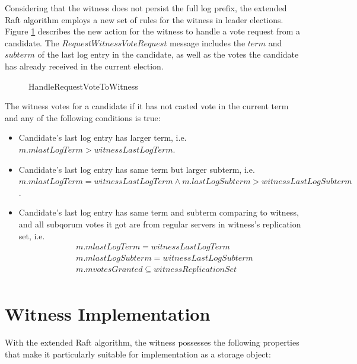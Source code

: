 Considering that the witness does not persist the full log prefix, the extended Raft algorithm employs a new set of rules for the witness in leader elections. Figure \ref{fig:handle-request-witness-vote} describes the new action for the witness to handle a vote request from a candidate. The $RequestWitnessVoteRequest$ message includes the $term$ and $subterm$ of the last log entry in the candidate, as well as the votes the candidate has already received in the current election.
\begin{figure}
    \begin{framed}
        
    \end{framed}
    \caption{HandleRequestVoteToWitness}
    \label{fig:handle-request-witness-vote}
\end{figure}
The witness votes for a candidate if it has not casted vote in the current term and any of the following conditions is true:
\begin{itemize}
    \item Candidate's last log entry has larger term, i.e. $m.mlastLogTerm > witnessLastLogTerm$.
    \item Candidate's last log entry has same term but larger subterm, i.e. $m.mlastLogTerm = witnessLastLogTerm \land m.lastLogSubterm > witnessLastLogSubterm$.
    \item Candidate's last log entry has same term and subterm comparing to witness, and all subqorum votes it got are from regular servers in witness's replication set, i.e.
          \begin{displaymath}
              \begin{aligned}
                   & m.mlastLogTerm = witnessLastLogTerm             \\
                   & m.mlastLogSubterm = witnessLastLogSubterm       \\
                   & m.mvotesGranted \subseteq witnessReplicationSet \\
              \end{aligned}
          \end{displaymath}
\end{itemize}


\section{Witness Implementation} \label{section:witness-implementation}
With the extended Raft algorithm, the witness possesses the following properties that make it particularly suitable for implementation as a storage object:

